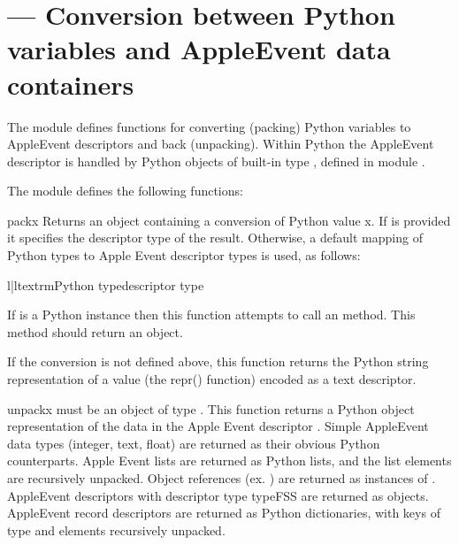 \section{ ---
         Conversion between Python variables and AppleEvent data containers}



The  module defines functions for converting (packing)
Python variables to AppleEvent descriptors and back (unpacking).
Within Python the AppleEvent descriptor is handled by Python objects
of built-in type , defined in module .

The  module defines the following functions:


\begin{funcdesc}{pack}{x}
Returns an  object  containing a conversion of Python
value x. If  is provided it specifies the descriptor
type of the result. Otherwise, a default mapping of Python types to
Apple Event descriptor types is used, as follows:

\begin{tableii}{l|l}{textrm}{Python type}{descriptor type}
\end{tableii}  
 
If  is a Python instance then this function attempts to call an
 method.  This method should return an
 object.

If the conversion  is not defined above, this function returns
the Python string representation of a value (the repr() function)
encoded as a text descriptor.
\end{funcdesc}

\begin{funcdesc}{unpack}{x}
   must be an object of type . This function
  returns a Python object representation of the data in the Apple
  Event descriptor . Simple AppleEvent data types (integer,
  text, float) are returned as their obvious Python counterparts.
  Apple Event lists are returned as Python lists, and the list
  elements are recursively unpacked.  Object references
  (ex. ) are returned as instances of
  .  AppleEvent descriptors with
  descriptor type typeFSS are returned as 
  objects.  AppleEvent record descriptors are returned as Python
  dictionaries, with keys of type  and elements recursively
  unpacked.
\end{funcdesc}


